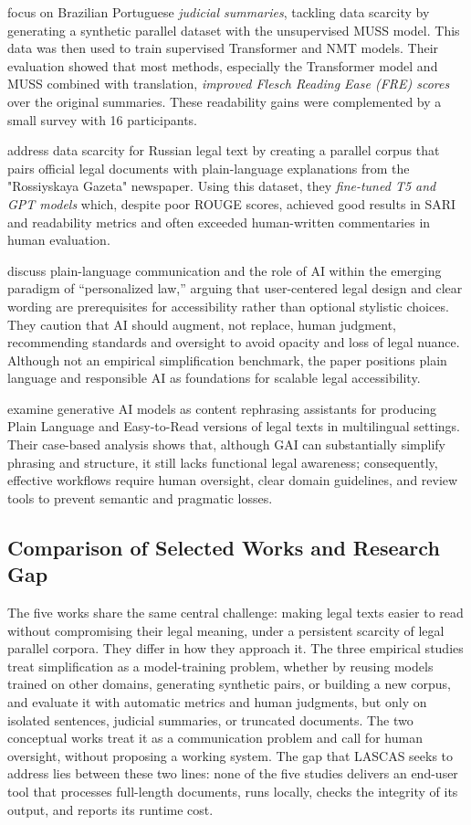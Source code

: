 \documentclass[english]{UNISINOSartigo} %
\begin{document}
 focus on Brazilian Portuguese \textit{judicial summaries}, tackling data scarcity by generating a synthetic parallel dataset with the unsupervised MUSS model. This data was then used to train supervised Transformer and NMT models. Their evaluation showed that most methods, especially the Transformer model and MUSS combined with translation, \textit{improved Flesch Reading Ease (FRE) scores} over the original summaries. These readability gains were complemented by a small survey with 16 participants.

 address data scarcity for Russian legal text by creating a parallel corpus that pairs official legal documents with plain-language explanations from the "Rossiyskaya Gazeta" newspaper. Using this dataset, they \textit{fine-tuned T5 and GPT models} which, despite poor ROUGE scores, achieved good results in SARI and readability metrics and often exceeded human-written commentaries in human evaluation.

 discuss plain-language communication and the role of AI within the emerging paradigm of “personalized law,” arguing that user-centered legal design and clear wording are prerequisites for accessibility rather than optional stylistic choices. They caution that AI should augment, not replace, human judgment, recommending standards and oversight to avoid opacity and loss of legal nuance. Although not an empirical simplification benchmark, the paper positions plain language and responsible AI as foundations for scalable legal accessibility.

 examine generative AI models as content rephrasing assistants for producing Plain Language and Easy-to-Read versions of legal texts in multilingual settings. Their case-based analysis shows that, although GAI can substantially simplify phrasing and structure, it still lacks functional legal awareness; consequently, effective workflows require human oversight, clear domain guidelines, and review tools to prevent semantic and pragmatic losses.

\subsection{Comparison of Selected Works and Research Gap}

The five works share the same central challenge: making legal texts easier to read without compromising their legal meaning, under a persistent scarcity of legal parallel corpora. They differ in how they approach it. The three empirical studies treat simplification as a model-training problem, whether by reusing models trained on other domains, generating synthetic pairs, or building a new corpus, and evaluate it with automatic metrics and human judgments, but only on isolated sentences, judicial summaries, or truncated documents. The two conceptual works treat it as a communication problem and call for human oversight, without proposing a working system. The gap that LASCAS seeks to address lies between these two lines: none of the five studies delivers an end-user tool that processes full-length documents, runs locally, checks the integrity of its output, and reports its runtime cost.
\end{document}
